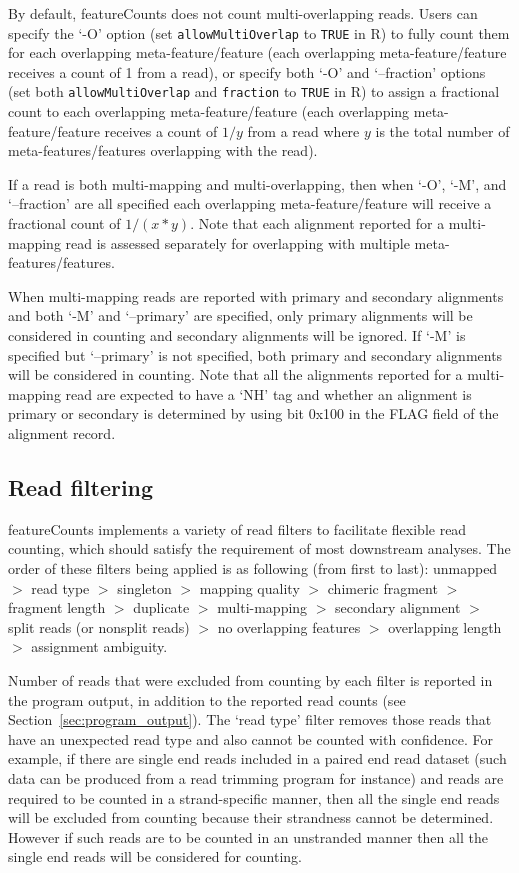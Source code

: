\documentclass[12pt]{report}
\newcommand{\code}[1]{{\small\texttt{#1}}}
\newcommand{\featureCounts}{\textsf{featureCounts}}
\newcommand{\R}{\textsf{R}}
\begin{document}
By default, {\featureCounts} does not count multi-overlapping reads.
Users can specify the `-O' option (set \code{allowMultiOverlap} to \code{TRUE} in \R) to fully count them for each overlapping meta-feature/feature (each overlapping meta-feature/feature receives a count of 1 from a read), or specify both `-O' and `--fraction' options (set both \code{allowMultiOverlap} and \code{fraction} to \code{TRUE} in \R) to assign a fractional count to each overlapping meta-feature/feature (each overlapping meta-feature/feature receives a count of $1/y$ from a read where $y$ is the total number of meta-features/features overlapping with the read).

If a read is both multi-mapping and multi-overlapping, then when `-O', `-M', and `--fraction' are all specified each overlapping meta-feature/feature will receive a fractional count of $1/(x*y)$.
Note that each alignment reported for a multi-mapping read is assessed separately for overlapping with multiple meta-features/features.

When multi-mapping reads are reported with primary and secondary alignments and both `-M' and `--primary' are specified, only primary alignments will be considered in counting and secondary alignments will be ignored.
If `-M' is specified but `--primary' is not specified, both primary and secondary alignments will be considered in counting.
Note that all the alignments reported for a multi-mapping read are expected to have a `NH' tag and whether an alignment is primary or secondary is determined by using bit {0x100} in the FLAG field of the alignment record.


\subsection{Read filtering}
\label{sec:read_filtering}

{\featureCounts} implements a variety of read filters to facilitate flexible read counting, which should satisfy the requirement of most downstream analyses.
The order of these filters being applied is as following (from first to last):
unmapped
$>$ read type
$>$ singleton
$>$ mapping quality
$>$ chimeric fragment
$>$ fragment length 
$>$ duplicate
$>$ multi-mapping
$>$ secondary alignment
$>$ split reads (or nonsplit reads)
$>$ no overlapping features
$>$ overlapping length
$>$ assignment ambiguity.

Number of reads that were excluded from counting by each filter is reported in the program output, in addition to the reported read counts (see Section~\ref{sec:program_output}). 
The `read type' filter removes those reads that have an unexpected read type and also cannot be counted with confidence.
For example, if there are single end reads included in a paired end read dataset (such data can be produced from a read trimming program for instance) and reads are required to be counted in a strand-specific manner, then all the single end reads will be excluded from counting because their strandness cannot be determined.
However if such reads are to be counted in an unstranded manner then all the single end reads will be considered for counting.
\end{document}
